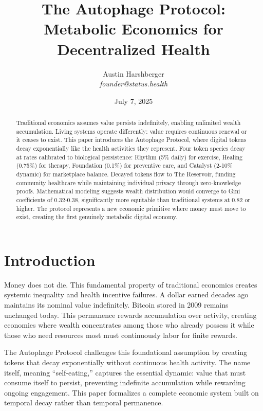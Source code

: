 \documentclass[11pt,letterpaper]{article}
\title{\textbf{The Autophage Protocol: Metabolic Economics for Decentralized Health}}
\author{Austin Harshberger\\
\small\textit{founder@status.health}}
\date{July 7, 2025}
\begin{document}
\maketitle

\begin{abstract}
Traditional economics assumes value persists indefinitely, enabling unlimited wealth accumulation. Living systems operate differently: value requires continuous renewal or it ceases to exist. This paper introduces the Autophage Protocol, where digital tokens decay exponentially like the health activities they represent. Four token species decay at rates calibrated to biological persistence: Rhythm (5\% daily) for exercise, Healing (0.75\%) for therapy, Foundation (0.1\%) for preventive care, and Catalyst (2-10\% dynamic) for marketplace balance. Decayed tokens flow to The Reservoir, funding community healthcare while maintaining individual privacy through zero-knowledge proofs. Mathematical modeling suggests wealth distribution would converge to Gini coefficients of 0.32-0.38, significantly more equitable than traditional systems at 0.82 or higher. The protocol represents a new economic primitive where money must move to exist, creating the first genuinely metabolic digital economy.
\end{abstract}

\tableofcontents
\newpage

\section{Introduction}

Money does not die. This fundamental property of traditional economics creates systemic inequality and health incentive failures. A dollar earned decades ago maintains its nominal value indefinitely. Bitcoin stored in 2009 remains unchanged today. This permanence rewards accumulation over activity, creating economies where wealth concentrates among those who already possess it while those who need resources most must continuously labor for finite rewards.

The Autophage Protocol challenges this foundational assumption by creating tokens that decay exponentially without continuous health activity. The name itself, meaning ``self-eating,'' captures the essential dynamic: value that must consume itself to persist, preventing indefinite accumulation while rewarding ongoing engagement. This paper formalizes a complete economic system built on temporal decay rather than temporal permanence.
\end{document}
